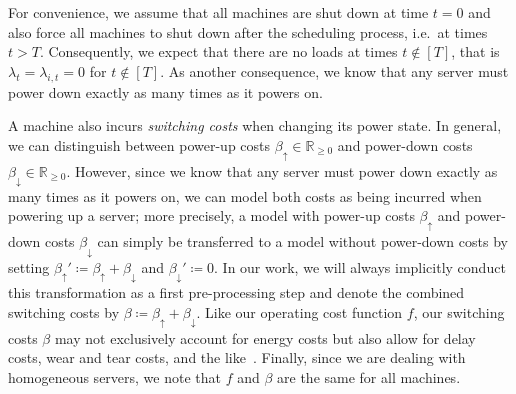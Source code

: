 For convenience, we assume that all machines are shut down at time $t=0$ and also force all machines to shut down after the scheduling process, i.e.\ at times $t>T$. Consequently, we expect that there are no loads at times $t\notin[T]$, that is $\lambda_t=\lambda_{i,t}=0$ for $t\notin[T]$. As another consequence, we know that any server must power down exactly as many times as it powers on.

A machine also incurs \emph{switching costs} when changing its power state. In general, we can distinguish between power-up costs $\beta_\uparrow\in\mathbb{R}_{\ge 0}$ and power-down costs $\beta_\downarrow\in\mathbb{R}_{\ge 0}$. However, since we know that any server must power down exactly as many times as it powers on, we can model both costs as being incurred when powering up a server; more precisely, a model with power-up costs $\beta_\uparrow$ and power-down costs $\beta_\downarrow$ can simply be transferred to a model without power-down costs by setting $\beta_\uparrow'\coloneqq\beta_\uparrow+\beta_\downarrow$ and $\beta_\downarrow'\coloneqq0$. In our work, we will always implicitly conduct this transformation as a first pre-processing step and denote the combined switching costs by $\beta\coloneqq\beta_\uparrow+\beta_\downarrow$. Like our operating cost function $f$, our switching costs $\beta$ may not exclusively account for energy costs but also allow for delay costs, wear and tear costs, and the like~\parencite{dyn-right-sizing}. Finally, since we are dealing with homogeneous servers, we note that $f$ and $\beta$ are the same for all machines.

